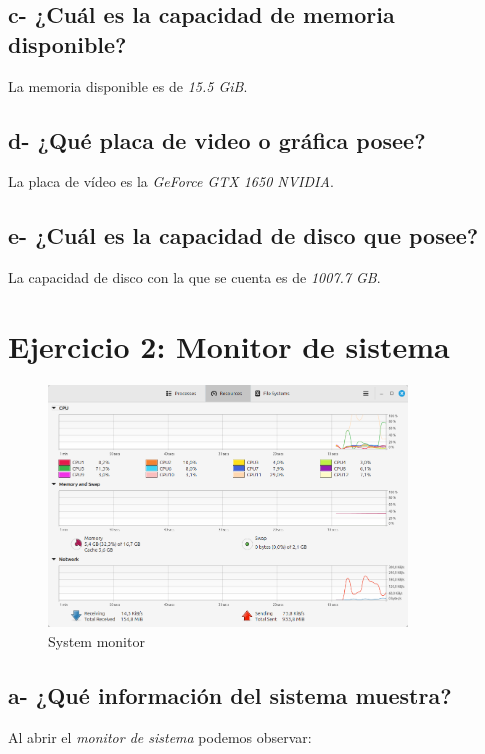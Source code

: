 \documentclass{article}
\begin{document}
\subsection*{c- ¿Cuál es la capacidad de memoria disponible?}
\noindent
La memoria disponible es de \textit{15.5 GiB}.

\subsection*{d- ¿Qué placa de video o gráfica posee?}
\noindent
La placa de vídeo es la \textit{GeForce GTX 1650 NVIDIA}.\@

\subsection*{e- ¿Cuál es la capacidad de disco que posee?}
\noindent
La capacidad de disco con la que se cuenta es de \textit{1007.7 GB}.\@


\section*{Ejercicio 2: Monitor de sistema}

\begin{figure}[h]
  \centering
  \includegraphics[width=0.85\textwidth]{resources/2.png}
  \caption{System monitor}
\end{figure}

\subsection*{a- ¿Qué información del sistema muestra?}

\noindent
Al abrir el \textit{monitor de sistema} podemos observar:
\end{document}
